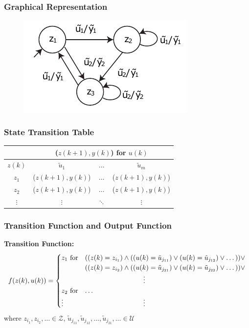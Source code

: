 \documentclass[10pt,a4paper]{article}
\newcommand{\tab}[1][1]{\hspace*{#1cm}}
\begin{document}
\subsubsection{Graphical Representation}
\begin{figure}[H]
	\includegraphics[width=0.7\columnwidth]{figures/fsm_mealy.pdf}
\end{figure}

\subsubsection{State Transition Table}
\begin{tabular}{cccc}
	\hline
	& \multicolumn{3}{c}{($z(k + 1), y(k)$) for $u(k)$} \\
	\hline
	$z(k)$ & $\tilde u_1$ & $\dots$ & $\tilde u_m$ \\
	\hline
	$z_1$ & ($z(k + 1), y(k)$) & $\dots$ & ($z(k + 1), y(k)$) \\
	$z_2$ & ($z(k + 1), y(k)$) & $\dots$ & ($z(k + 1), y(k)$) \\
	$\vdots$ & $\vdots$ & $\ddots$ & $\vdots$ \\
	\hline
\end{tabular}

\subsubsection{Transition Function and Output Function}
\textbf{Transition Function:} ~\\
$$
	f(z(k), u(k)) = \begin{cases}
		z_1 \text{ for} & ((z(k) = z_{i_1}) \land ((u(k) = \tilde u_{j_{11}}) \lor (u(k) = \tilde u_{j_{12}}) \lor \dots)) \lor \\
		& ((z(k) = z_{i_2}) \land ((u(k) = \tilde u_{j_{21}}) \lor (u(k) = \tilde u_{j_{22}}) \lor \dots)) \lor \\
		& \tab[3] \vdots \\
		z_2 \text{ for} & \dots \\
		\vdots & \tab[3] \vdots 
	\end{cases}
$$
where $z_{i_1}, z_{i_2}, \dots \in \mathcal Z$, $\tilde u_{j_{11}}, \tilde u_{j_{12}}, \dots, \tilde u_{j_{21}}, \dots \in \mathcal U$
\end{document}
